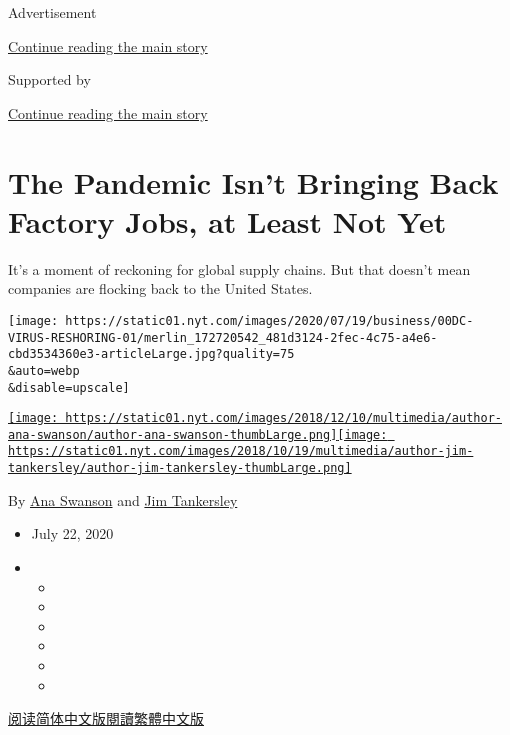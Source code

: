 Advertisement

\protect\hyperlink{after-top}{Continue reading the main story}

Supported by

\protect\hyperlink{after-sponsor}{Continue reading the main story}

\hypertarget{the-pandemic-isnt-bringing-back-factory-jobs-at-least-not-yet}{%
\section{The Pandemic Isn't Bringing Back Factory Jobs, at Least Not
Yet}\label{the-pandemic-isnt-bringing-back-factory-jobs-at-least-not-yet}}

It's a moment of reckoning for global supply chains. But that doesn't
mean companies are flocking back to the United States.

\texttt{[image: https://static01.nyt.com/images/2020/07/19/business/00DC-VIRUS-RESHORING-01/merlin\_172720542\_481d3124-2fec-4c75-a4e6-cbd3534360e3-articleLarge.jpg?quality=75\\\&auto=webp\\\&disable=upscale]}

\href{https://www.nytimes.com/by/ana-swanson}{\texttt{[image: https://static01.nyt.com/images/2018/12/10/multimedia/author-ana-swanson/author-ana-swanson-thumbLarge.png]}}\href{https://www.nytimes.com/by/jim-tankersley}{\texttt{[image: https://static01.nyt.com/images/2018/10/19/multimedia/author-jim-tankersley/author-jim-tankersley-thumbLarge.png]}}

By \href{https://www.nytimes.com/by/ana-swanson}{Ana Swanson} and
\href{https://www.nytimes.com/by/jim-tankersley}{Jim Tankersley}

\begin{itemize}
\item
  July 22, 2020
\item
  \begin{itemize}
  \item
  \item
  \item
  \item
  \item
  \item
  \end{itemize}
\end{itemize}

\href{https://cn.nytimes.com/business/20200723/coronavirus-globalization-jobs-supply-chain-china/}{阅读简体中文版}\href{https://cn.nytimes.com/business/20200723/coronavirus-globalization-jobs-supply-chain-china/zh-hant/}{閱讀繁體中文版}

